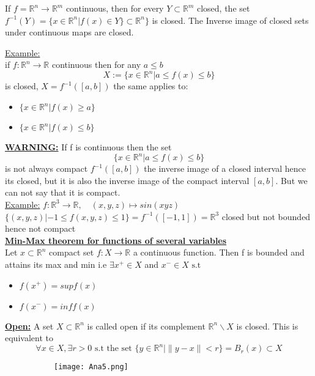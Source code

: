 \documentclass[8pt]{extreport}
\newcommand{\R}{\mathbb{R}}
\begin{document}
If $f = \R^n \to \R^m$ continuous, then for every $Y \subset \R^m$ closed, the set $f^{-1}(Y) = \{x \in \R^n| f(x) \in Y\} \subset \R^n\}$ is closed. The Inverse image of closed sets under continuous maps are closed.

\underline{Example:}\\
if $f:\R^n \to \R$ continuous then for any $a \leq b$ 
$$ X:= \{ x \in \R^n | a \leq f(x) \leq b\}$$
is closed, $X = f^{-1}([a,b])$
the same applies to:
\begin{itemize}
\item $\{x \in \R^n | f(x) \geq a \}$
\item $\{x \in \R^n | f(x) \leq b \}$
\end{itemize}

\underline{\textbf{WARNING:}} If f is continuous then the set
$$\{x \in \R^n | a \leq f(x) \leq b\}$$
is not always compact $f^{-1}([a,b])$ the inverse image of a closed interval hence its closed, but it is also the inverse image of the compact interval $[a,b]$. But we can not say that it is compact.\\
\underline{Example:}
$f:\R^3 \to \R, \quad (x,y,z) \mapsto sin(xyz)$\\
$\{(x,y,z) | -1 \leq f(x,y,z) \leq 1 \} = f^{-1}([-1,1]) = \R^3$ closed but not bounded hence not compact\\

\underline{\textbf{Min-Max theorem for functions of several variables}}\\
Let $x \subset \R^n$ compact set $f:X \to \R$ a continuous function. Then f is bounded and attains its max and min i.e 
$ \exists x^+ \in X$ and $x^- \in X \text{ s.t }$
\begin{itemize}
\item $f(x^+) = sup f(x)$
\item $f(x^-) = inf f(x)$
\end{itemize}

\underline{\textbf{Open:}} A set $X \subset \R^n$ is called open if its complement $\R^n\backslash X$ is closed. This is equivalent to 
$$ \forall x \in X, \exists r > 0 \text{ s.t the set } \{y \in \R^n | \|y-x\| < r \} = B_r(x) \subset X $$

\begin{figure}[H]
\centering
\begin{subfigure}[b]{0.4\linewidth}
\texttt{[image: Ana5.png]}
\end{subfigure}

\end{figure}
\end{document}
